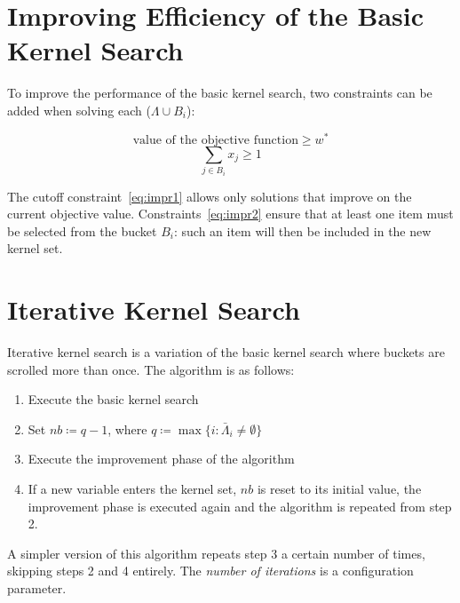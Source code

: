 \section{Improving Efficiency of the Basic Kernel Search}
To improve the performance of the basic kernel search, two constraints can be added
when solving each (\(\Lambda \cup B_{i}\)):

\begin{equation}
    \label{eq:impr1}
    \text{value of the objective function} \geq w^{*}
\end{equation}
\begin{equation}
    \label{eq:impr2}
    \sum_{j \in B_{i}} x_{j} \geq 1
\end{equation}

The cutoff constraint~\eqref{eq:impr1} allows only solutions that improve on the current
objective value.
Constraints~\eqref{eq:impr2} ensure that at least one item must be selected from the bucket \(B_{i}\):
such an item will then be included in the new kernel set.


\section{Iterative Kernel Search}\label{sec:iter}
Iterative kernel search is a variation of the basic kernel search where buckets are scrolled more than once.
The algorithm is as follows:
\begin{enumerate}
    \item Execute the basic kernel search
    \item Set \(nb \coloneqq q-1\), where \(q \coloneqq \max\{i:\bar{\Lambda}_{i} \neq \emptyset\}\)
    \item Execute the improvement phase of the algorithm
    \item If a new variable enters the kernel set, \(nb\) is reset to its initial value,
    the improvement phase is executed again and the algorithm is repeated from step 2.
\end{enumerate}

A simpler version of this algorithm repeats step 3 a certain number of times,
skipping steps 2 and 4 entirely.
The \textit{number of iterations} is a configuration parameter.